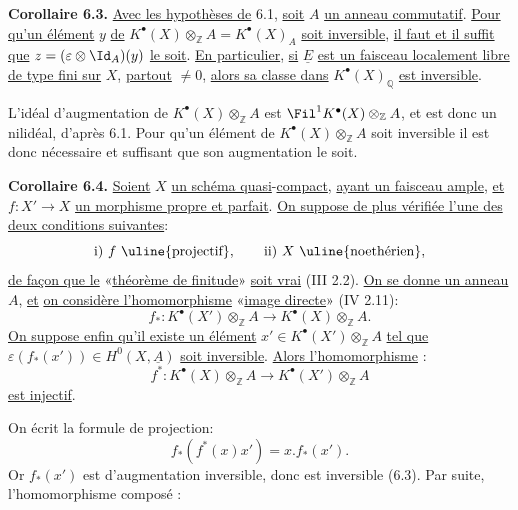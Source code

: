 
\textbf{Corollaire 6.3.} \uline{Avec les hypothèses de} 6.1, \uline{soit} $A$ \uline{un anneau commutatif}. \uline{Pour qu'un élément} $y$ \uline{de} $K^{\bullet}(X)\otimes_{\mathbb Z}A=K^{\bullet}(X)_A$ \uline{soit inversible}, \uline{il faut et il suffit que} $z=(\varepsilon\otimes\Id_A)(y)$ \uline{le soit}. \uline{En particulier}, \uline{si} $\underline{E}$ \uline{est un faisceau localement libre de type fini sur} $X$, \uline{partout} $\ne0$, \uline{alors sa classe dans} $K^{\bullet}(X)_{\mathbb Q}$ \uline{est inversible}.

L'idéal d'augmentation de $K^{\bullet}(X)\otimes_{\mathbb Z}A$ est $\Fil^1K^{\bullet}(X)\otimes_{\mathbb Z}A$, et est donc un nilidéal, d'après 6.1. Pour qu'un élément de $K^{\bullet}(X)\otimes_{\mathbb Z}A$ soit inversible il est donc nécessaire et suffisant que son augmentation le soit.

\textbf{Corollaire 6.4.} \uline{Soient} $X$ \uline{un schéma quasi}-\uline{compact}, \uline{ayant un faisceau ample}, \uline{et} $f:X'\to X$ \uline{un morphisme propre et parfait}. \uline{On suppose de plus vérifiée l'une des deux conditions suivantes}:
\[
  \text{i) } f\text{ \uline{projectif}},\qquad
  \text{ii) } X\text{ \uline{noethérien}},
\]
\uline{de façon que le} «\uline{théorème de finitude}» \uline{soit vrai} (III 2.2). \uline{On se donne un anneau} $A$, \uline{et} \uline{on considère l'homomorphisme} «\uline{image directe}» (IV 2.11):
\[
  f_*:K^{\bullet}(X')\otimes_{\mathbb Z}A\longrightarrow K^{\bullet}(X)\otimes_{\mathbb Z}A.
\]
\uline{On suppose enfin qu'il existe un élément} $x'\in K^{\bullet}(X')\otimes_{\mathbb Z}A$ \uline{tel que} $\varepsilon(f_*(x'))\in H^0(X,\underline{A})$ \uline{soit inversible}. \uline{Alors l'homomorphisme} :
\[
  f^*:K^{\bullet}(X)\otimes_{\mathbb Z}A\longrightarrow K^{\bullet}(X')\otimes_{\mathbb Z}A
\]
\uline{est injectif}.

On écrit la formule de projection:
\[
  f_*(f^*(x)x')=x.f_*(x').
\]
Or $f_*(x')$ est d'augmentation inversible, donc est inversible (6.3). Par suite, l'homomorphisme composé :
